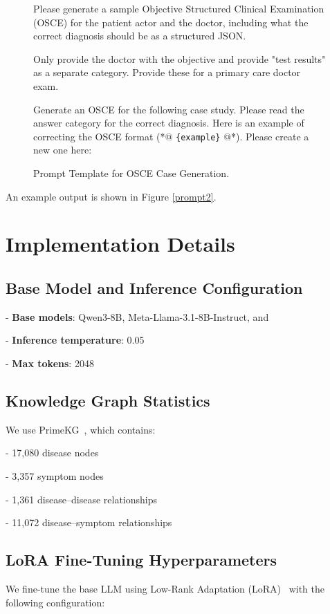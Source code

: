 \documentclass[11pt]{article}
\newcommand{\placeholder}[1]{%
	\colorbox{blue!10}{\texttt{\color{blue!80!black}\{#1\}}}%
}
\begin{document}
\begin{figure}[htbp]
	\caption{Prompt Template for OSCE Case Generation.}
	\begin{promptlisting}
		Please generate a sample Objective Structured Clinical Examination (OSCE) for the patient actor and the doctor, including what the correct diagnosis should be as a structured JSON. 
		
		Only provide the doctor with the objective and provide "test results" as a separate category. Provide these for a primary care doctor exam.
		
		Generate an OSCE for the following case study. Please read the answer category for the correct diagnosis. Here is an example of correcting the OSCE format (*@\placeholder{example}@*). Please create a new one here:
	\end{promptlisting}
	\label{prompt1}
\end{figure}

An example output is shown in Figure \ref{prompt2}.

\section{Implementation Details}

\subsection{Base Model and Inference Configuration}

- \textbf{Base models}: Qwen3-8B, Meta-Llama-3.1-8B-Instruct, and 

- \textbf{Inference temperature}: 0.05

- \textbf{Max tokens}: 2048

\subsection{Knowledge Graph Statistics}

We use PrimeKG~\cite{primekg2023}, which contains:

\quad- 17,080 disease nodes

\quad- 3,357 symptom nodes

\quad- 1,361 disease–disease relationships

\quad- 11,072 disease–symptom relationships


\subsection{LoRA Fine-Tuning Hyperparameters}
We fine-tune the base LLM using Low-Rank Adaptation (LoRA)~\cite{lora2021hu} with the following configuration:
\end{document}

